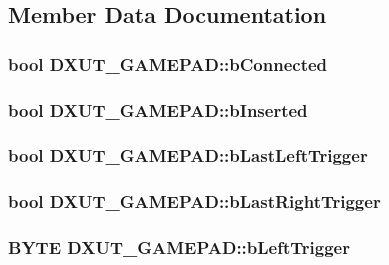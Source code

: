 \subsection{Member Data Documentation}
\hypertarget{struct_d_x_u_t___g_a_m_e_p_a_d_ab5bf1de281e3e8676608b965865846d0}{
\subsubsection[{bConnected}]{\setlength{\rightskip}{0pt plus 5cm}bool {\bf DXUT\_\-GAMEPAD::bConnected}}}
\label{struct_d_x_u_t___g_a_m_e_p_a_d_ab5bf1de281e3e8676608b965865846d0}
\hypertarget{struct_d_x_u_t___g_a_m_e_p_a_d_ace33cf229d494dd25bcc2cb083ac7ccb}{
\subsubsection[{bInserted}]{\setlength{\rightskip}{0pt plus 5cm}bool {\bf DXUT\_\-GAMEPAD::bInserted}}}
\label{struct_d_x_u_t___g_a_m_e_p_a_d_ace33cf229d494dd25bcc2cb083ac7ccb}
\hypertarget{struct_d_x_u_t___g_a_m_e_p_a_d_af2aa7513882a92c0c66b74f786b8cc52}{
\subsubsection[{bLastLeftTrigger}]{\setlength{\rightskip}{0pt plus 5cm}bool {\bf DXUT\_\-GAMEPAD::bLastLeftTrigger}}}
\label{struct_d_x_u_t___g_a_m_e_p_a_d_af2aa7513882a92c0c66b74f786b8cc52}
\hypertarget{struct_d_x_u_t___g_a_m_e_p_a_d_af3ac25270da6d465e568b8f35cbb7c16}{
\subsubsection[{bLastRightTrigger}]{\setlength{\rightskip}{0pt plus 5cm}bool {\bf DXUT\_\-GAMEPAD::bLastRightTrigger}}}
\label{struct_d_x_u_t___g_a_m_e_p_a_d_af3ac25270da6d465e568b8f35cbb7c16}
\hypertarget{struct_d_x_u_t___g_a_m_e_p_a_d_afad6b4182e7931e91b32609421f49354}{
\subsubsection[{bLeftTrigger}]{\setlength{\rightskip}{0pt plus 5cm}BYTE {\bf DXUT\_\-GAMEPAD::bLeftTrigger}}}
